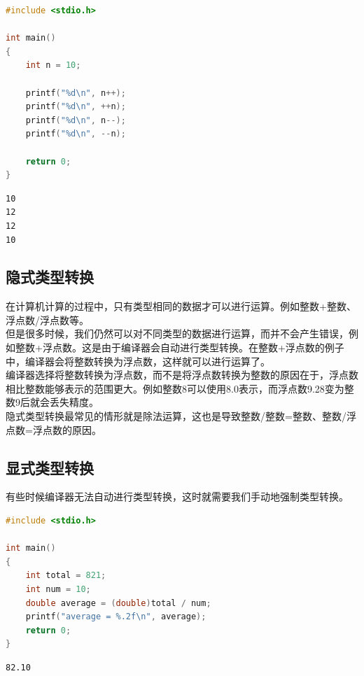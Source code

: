 \begin{lstlisting}[language=C]
#include <stdio.h>

int main()
{
	int n = 10;

	printf("%d\n", n++);
	printf("%d\n", ++n);
	printf("%d\n", n--);
	printf("%d\n", --n);

	return 0;
}
\end{lstlisting}

\begin{tcolorbox}
	\begin{verbatim}
10
12
12
10
	\end{verbatim}
\end{tcolorbox}

\vspace{0.5cm}

\subsection{隐式类型转换}

在计算机计算的过程中，只有类型相同的数据才可以进行运算。例如整数+整数、浮点数/浮点数等。\\

但是很多时候，我们仍然可以对不同类型的数据进行运算，而并不会产生错误，例如整数+浮点数。这是由于编译器会自动进行类型转换。在整数+浮点数的例子中，编译器会将整数转换为浮点数，这样就可以进行运算了。\\

编译器选择将整数转换为浮点数，而不是将浮点数转换为整数的原因在于，浮点数相比整数能够表示的范围更大。例如整数8可以使用8.0表示，而浮点数9.28变为整数9后就会丢失精度。\\

隐式类型转换最常见的情形就是除法运算，这也是导致整数/整数=整数、整数/浮点数=浮点数的原因。\\

\subsection{显式类型转换}

有些时候编译器无法自动进行类型转换，这时就需要我们手动地强制类型转换。\\


\begin{lstlisting}[language=C]
#include <stdio.h>

int main()
{
	int total = 821;
	int num = 10;
	double average = (double)total / num;
	printf("average = %.2f\n", average);
	return 0;
}
\end{lstlisting}

\begin{tcolorbox}
	\begin{verbatim}
82.10
	\end{verbatim}
\end{tcolorbox}

\newpage
